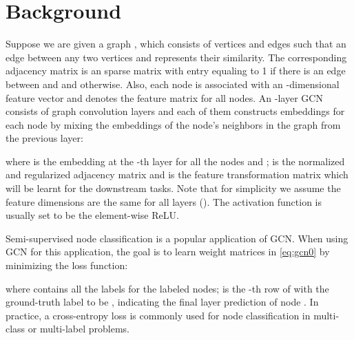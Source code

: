 \documentclass[sigconf]{acmart}
\begin{document}
\section{Background}
 Suppose we are given a graph , which consists 
of  vertices and  edges such that an edge between any two 
vertices  and  represents their similarity. The corresponding 
adjacency matrix  is an  sparse matrix 
with  entry equaling to 1 if there is an edge between  and  
and  otherwise. Also, each node is associated with an -dimensional feature vector and   denotes the feature matrix for all  nodes.
An -layer GCN~\cite{kipf2017semi} consists of  graph convolution layers and each of them constructs embeddings for each node by mixing the embeddings of the node's neighbors in the graph from the previous layer:

where  is the embedding at the -th layer for all the  nodes and ;   is the normalized and regularized adjacency matrix 
and  is the feature transformation matrix which will be learnt for the downstream tasks.
Note that for simplicity we assume the feature dimensions are the same for all layers (). 
The activation function  is usually set to be the element-wise ReLU. 

Semi-supervised node classification is a popular application of GCN. When using GCN for this application, the goal is to learn weight matrices in \eqref{eq:gcn0} by minimizing the loss function:

where  contains all the labels for the labeled nodes;  is the -th row of  with the ground-truth label to be , indicating the final layer prediction of node . In practice, a cross-entropy loss is commonly used for node classification in multi-class or multi-label problems.
\end{document}
